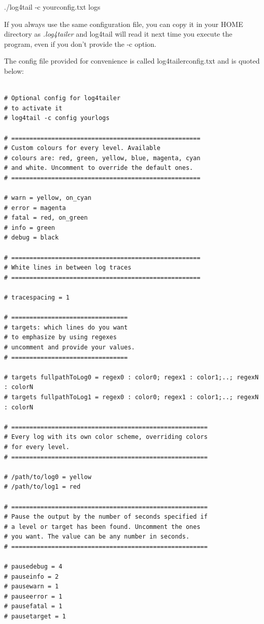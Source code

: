 \begin{cmd}
 ./log4tail -c yourconfig.txt logs
\end{cmd}
If you always use the same configuration file, you can copy it in your HOME
directory as \emph{.log4tailer} and log4tail will read it next time you execute
the program, even if you don't provide the -c option.

The config file provided for convenience is called log4tailerconfig.txt and is quoted below:

\begin{verbatim}

# Optional config for log4tailer
# to activate it
# log4tail -c config yourlogs

# ====================================================
# Custom colours for every level. Available 
# colours are: red, green, yellow, blue, magenta, cyan 
# and white. Uncomment to override the default ones.
# ====================================================

# warn = yellow, on_cyan
# error = magenta 
# fatal = red, on_green
# info = green
# debug = black

# ====================================================
# White lines in between log traces
# ====================================================

# tracespacing = 1

# ================================
# targets: which lines do you want 
# to emphasize by using regexes
# uncomment and provide your values.
# ================================

# targets fullpathToLog0 = regex0 : color0; regex1 : color1;..; regexN : colorN
# targets fullpathToLog1 = regex0 : color0; regex1 : color1;..; regexN : colorN

# ======================================================
# Every log with its own color scheme, overriding colors 
# for every level.
# ======================================================

# /path/to/log0 = yellow
# /path/to/log1 = red

# ======================================================
# Pause the output by the number of seconds specified if 
# a level or target has been found. Uncomment the ones 
# you want. The value can be any number in seconds. 
# ======================================================

# pausedebug = 4
# pauseinfo = 2
# pausewarn = 1
# pauseerror = 1
# pausefatal = 1
# pausetarget = 1


\end{verbatim}
